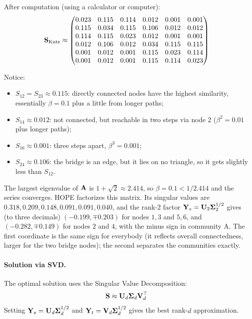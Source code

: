 \begin{notechapter}
\begin{example}
After computation (using a calculator or computer):
\[
\mathbf{S}_{\text{Katz}} \approx \begin{pmatrix}
0.023 & 0.115 & 0.114 & 0.012 & 0.001 & 0.001 \\
0.115 & 0.034 & 0.115 & 0.106 & 0.012 & 0.012 \\
0.114 & 0.115 & 0.023 & 0.012 & 0.001 & 0.001 \\
0.012 & 0.106 & 0.012 & 0.034 & 0.115 & 0.115 \\
0.001 & 0.012 & 0.001 & 0.115 & 0.023 & 0.114 \\
0.001 & 0.012 & 0.001 & 0.115 & 0.114 & 0.023
\end{pmatrix}
\]

Notice:
\begin{itemize}
    \item $S_{12} = S_{23} \approx 0.115$: directly connected nodes have the highest similarity, essentially $\beta = 0.1$ plus a little from longer paths;
    \item $S_{14} \approx 0.012$: not connected, but reachable in two steps via node $2$ ($\beta^2 = 0.01$ plus longer paths);
    \item $S_{16} \approx 0.001$: three steps apart, $\beta^3 = 0.001$;
    \item $S_{24} \approx 0.106$: the bridge is an edge, but it lies on no triangle, so it gets slightly less than $S_{12}$.
\end{itemize}

The largest eigenvalue of $\mathbf{A}$ is $1 + \sqrt2 \approx 2.414$, so $\beta = 0.1 < 1/2.414$ and the series converges. HOPE factorizes this matrix. Its singular values are $0.318, 0.209, 0.148, 0.091, 0.091, 0.040$, and the rank-$2$ factor $\mathbf{Y}_s = \mathbf U_2\mathbf\Sigma_2^{1/2}$ gives (to three decimals) $(-0.199, \mp0.203)$ for nodes $1, 3$ and $5, 6$, and $(-0.282, \mp0.149)$ for nodes $2$ and $4$, with the minus sign in community A. The first coordinate is the same sign for everybody (it reflects overall connectedness, larger for the two bridge nodes); the second separates the communities exactly.
\end{example}

\paragraph{Solution via SVD.} The optimal solution uses the Singular Value Decomposition:
\[
\mathbf{S} \approx \mathbf{U}_d \mathbf{\Sigma}_d \mathbf{V}_d^\top
\]
Setting $\mathbf{Y}_s = \mathbf{U}_d \mathbf{\Sigma}_d^{1/2}$ and $\mathbf{Y}_t = \mathbf{V}_d \mathbf{\Sigma}_d^{1/2}$ gives the best rank-$d$ approximation.


\end{notechapter}

